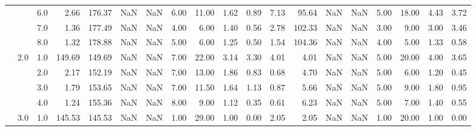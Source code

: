 \begin{tabular}{lllrrrrrrrrrrrrrrrr}
       &     & 6.0  &      2.66 &     176.37 &               NaN &                NaN &  6.00 &  11.00 &             1.62 &                         0.89 &      7.13 &      95.64 &               NaN &                NaN &  5.00 &  18.00 &             4.43 &                         3.72 \\
       &     & 7.0  &      1.36 &     177.49 &               NaN &                NaN &  4.00 &   6.00 &             1.40 &                         0.56 &      2.78 &     102.33 &               NaN &                NaN &  3.00 &   9.00 &             3.00 &                         3.46 \\
       &     & 8.0  &      1.32 &     178.88 &               NaN &                NaN &  5.00 &   6.00 &             1.25 &                         0.50 &      1.54 &     104.36 &               NaN &                NaN &  4.00 &   5.00 &             1.33 &                         0.58 \\
       & 2.0 & 1.0  &    149.69 &     149.69 &               NaN &                NaN &  7.00 &  22.00 &             3.14 &                         3.30 &      4.01 &       4.01 &               NaN &                NaN &  5.00 &  20.00 &             4.00 &                         3.65 \\
       &     & 2.0  &      2.17 &     152.19 &               NaN &                NaN &  7.00 &  13.00 &             1.86 &                         0.83 &      0.68 &       4.70 &               NaN &                NaN &  5.00 &   6.00 &             1.20 &                         0.45 \\
       &     & 3.0  &      1.79 &     153.65 &               NaN &                NaN &  7.00 &  11.50 &             1.64 &                         1.13 &      0.87 &       5.66 &               NaN &                NaN &  5.00 &   9.00 &             1.80 &                         0.95 \\
       &     & 4.0  &      1.24 &     155.36 &               NaN &                NaN &  8.00 &   9.00 &             1.12 &                         0.35 &      0.61 &       6.23 &               NaN &                NaN &  5.00 &   7.00 &             1.40 &                         0.55 \\
       & 3.0 & 1.0  &    145.53 &     145.53 &               NaN &                NaN &  1.00 &  29.00 &             1.00 &                         0.00 &      2.05 &       2.05 &               NaN &                NaN &  1.00 &  20.00 &             1.00 &                         0.00 \\

\end{tabular}
